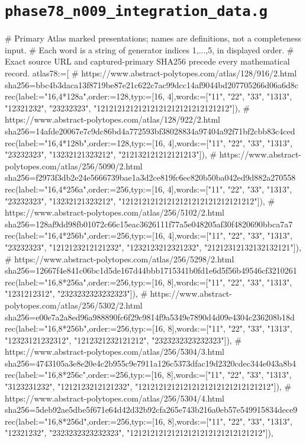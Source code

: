 \documentclass[11pt,a4paper]{article}
\begin{document}
\section*{\texttt{phase78\_n009\_integration\_data.g}}
\begin{CompleteProgram}
# Primary Atlas marked presentations; names are definitions, not a completeness input.
# Each word is a string of generator indices 1,...,5, in displayed order.
# Exact source URL and captured-primary SHA256 precede every mathematical record.
atlas78:=[
# https://www.abstract-polytopes.com/atlas/128/916/2.html sha256=bbc4b3daca13f8719be87e21c622c7ac99dcc14af9044bd207705266d06a6d8c
rec(label:="{16,4}*128a",order:=128,typ:=[16, 4],words:=["11", "22", "33", "1313", "12321232", "23232323", "12121212121212121212121212121212"]),
# https://www.abstract-polytopes.com/atlas/128/922/2.html sha256=14afde20067e7c9dc86bd4a772593bf38028834a97404a92f71bf2cbb83c4ced
rec(label:="{16,4}*128b",order:=128,typ:=[16, 4],words:=["11", "22", "33", "1313", "23232323", "13232121323212", "212132121212121213"]),
# https://www.abstract-polytopes.com/atlas/256/5090/2.html sha256=f2973f3db2e24e5666739bae1a3d2ce819fc6ec820b50ba042ed9d882a270558
rec(label:="{16,4}*256a",order:=256,typ:=[16, 4],words:=["11", "22", "33", "1313", "23232323", "13232121323212", "12121212121212121212121212121212"]),
# https://www.abstract-polytopes.com/atlas/256/5102/2.html sha256=128af9dd98fb01072c66c15eac3626111f77a5e048205af30f4820690bbca7a7
rec(label:="{16,4}*256b",order:=256,typ:=[16, 4],words:=["11", "22", "33", "1313", "23232323", "1212123212121232", "1232123212321232", "21212312132132132121"]),
# https://www.abstract-polytopes.com/atlas/256/5298/2.html sha256=12667f4e841c06bc1d5de167d44bbb1715341b0fd1e6d5f56b49546cf3210261
rec(label:="{16,8}*256a",order:=256,typ:=[16, 8],words:=["11", "22", "33", "1313", "1231212312", "2323232323232323"]),
# https://www.abstract-polytopes.com/atlas/256/5302/2.html sha256=e00e7a2a8ed96a988890fc6f29c9814f9a5349e7890d4d09e4304c236208b18d
rec(label:="{16,8}*256b",order:=256,typ:=[16, 8],words:=["11", "22", "33", "1313", "12323121232312", "1212321232121212", "2323232323232323"]),
# https://www.abstract-polytopes.com/atlas/256/5304/3.html sha256=4743105a3e8e20e4c2b955c9e7911a126c5373dfac19d2320cdec344e043a8b4
rec(label:="{16,8}*256c",order:=256,typ:=[16, 8],words:=["11", "22", "33", "1313", "3123231232", "1212123212121232", "12121212121212121212121212121212"]),
# https://www.abstract-polytopes.com/atlas/256/5304/4.html sha256=5deb92ae5dbe5f671e64d42d32b92cfa265e743b216a0eb57e549915834dece9
rec(label:="{16,8}*256d",order:=256,typ:=[16, 8],words:=["11", "22", "33", "1313", "12321232", "2323232323232323", "12121212121212121212121212121212"]),

\end{CompleteProgram}
\end{document}
